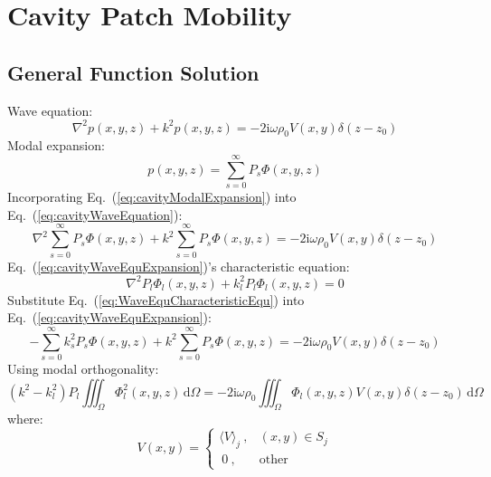 \documentclass[a4paper,UTF8]{ctexart}
\begin{document}
	
	
	\section{Cavity Patch Mobility}
	
	\subsection{General Function Solution}
	Wave equation:
	\begin{equation}
	\label{eq:cavityWaveEquation}
	\nabla^2p\left(x,y,z\right)+k^2p\left(x,y,z\right)
	= -2\mathrm i\omega\rho_0V\left(x,y\right)\delta\left(z-z_0\right)
	\end{equation}
	Modal expansion:
	\begin{equation}
	\label{eq:cavityModalExpansion}
	p\left(x,y,z\right)
	= \sum_{s=0}^{\infty} P_s\Phi\left(x,y,z\right)
	\end{equation}
	Incorporating Eq.~(\ref{eq:cavityModalExpansion}) into Eq.~(\ref{eq:cavityWaveEquation}):
	\begin{equation}
	\label{eq:cavityWaveEquExpansion}
	\nabla^2\sum_{s=0}^{\infty}P_s\Phi\left(x,y,z\right) + 
		k^2\sum_{s=0}^{\infty}P_s\Phi\left(x,y,z\right)
	= -2\mathrm i\omega\rho_0V\left(x,y\right)\delta\left(z-z_0\right)
	\end{equation}
	Eq.~(\ref{eq:cavityWaveEquExpansion})'s characteristic equation:
	\begin{equation}
	\label{eq:WaveEquCharacteristicEqu}
	\nabla^2P_l\Phi_l\left(x,y,z\right)+k_l^2P_l\Phi_l\left(x,y,z\right)=0
	\end{equation}
	Substitute Eq.~(\ref{eq:WaveEquCharacteristicEqu}) into Eq.~(\ref{eq:cavityWaveEquExpansion}):
	\begin{equation}
	\label{eq:WaveEquDecouplePrepare}
	-\sum_{s=0}^{\infty}k_s^2P_s\Phi\left(x,y,z\right) + 
		k^2\sum_{s=0}^{\infty}P_s\Phi\left(x,y,z\right)
	= -2\mathrm i\omega\rho_0V\left(x,y\right)\delta\left(z-z_0\right)
	\end{equation}
	Using modal orthogonality:
	\begin{equation}
	\label{eq:cavityWaveEquDecoupled}
	\left(k^2-k_l^2\right) P_l
	\iiint_\Omega\Phi_l^2\left(x,y,z\right)\,\mathrm d\Omega
	= -2\mathrm i\omega\rho_0 
		\iiint_\Omega 
		\Phi_l\left(x,y,z\right) 
		V\left(x,y\right) 
		\delta\left( z-z_0\right) \,\mathrm d\Omega
	\end{equation}
	where:
	\begin{equation}
	\label{eq:cavityPatchVelocity}
	V\left(x,y\right)
	= \begin{cases}
	\langle V\rangle_j\ , &\left( x,y\right) \in S_j\\
	\ 0\ , &\mathrm{other}
	\end{cases}
	\end{equation}
\end{document}
